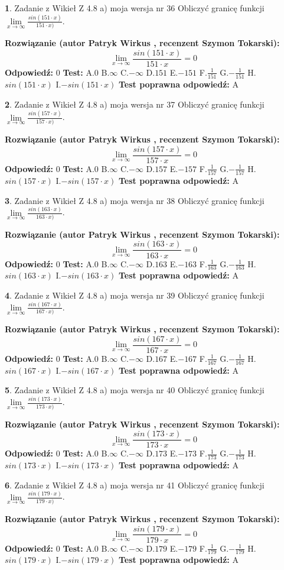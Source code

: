\documentclass[12pt, a4paper]{article}
\theoremstyle{definition} %
\newtheorem{zad}{}
\newcommand{\zadStart}[1]{\begin{zad}#1\newline}
\newcommand{\zadStop}{\end{zad}}
\newcommand{\rozwStart}[2]{\noindent \textbf{Rozwiązanie (autor #1 , recenzent #2): }\newline}
\newcommand{\rozwStop}{\newline}
\newcommand{\odpStart}{\noindent \textbf{Odpowiedź:}\newline}
\newcommand{\odpStop}{\newline}
\newcommand{\testStart}{\noindent \textbf{Test:}\newline}
\newcommand{\testStop}{\newline}
\newcommand{\kluczStart}{\noindent \textbf{Test poprawna odpowiedź:}\newline}
\newcommand{\kluczStop}{\newline}
\begin{document}
\zadStart{Zadanie z Wikieł Z 4.8 a) moja wersja nr 36}
Obliczyć granicę funkcji $\lim\limits_{x\to \infty}\frac{sin(151\cdot x)}{151\cdot x)}$.
\zadStop
\rozwStart{Patryk Wirkus}{Szymon Tokarski}
$$\lim\limits_{x\to \infty}\frac{sin(151\cdot x)}{151\cdot x}=
0$$
\rozwStop
\odpStart
$0$
\odpStop
\testStart
A.$0$ B.$\infty$ C.$-\infty$ D.$151$ E.$-151$
F.$\frac{1}{151}$ G.$-\frac{1}{151}$
H.$sin(151\cdot x)$
I.$-sin(151\cdot x)$
\testStop
\kluczStart
A
\kluczStop



\zadStart{Zadanie z Wikieł Z 4.8 a) moja wersja nr 37}
Obliczyć granicę funkcji $\lim\limits_{x\to \infty}\frac{sin(157\cdot x)}{157\cdot x)}$.
\zadStop
\rozwStart{Patryk Wirkus}{Szymon Tokarski}
$$\lim\limits_{x\to \infty}\frac{sin(157\cdot x)}{157\cdot x}=
0$$
\rozwStop
\odpStart
$0$
\odpStop
\testStart
A.$0$ B.$\infty$ C.$-\infty$ D.$157$ E.$-157$
F.$\frac{1}{157}$ G.$-\frac{1}{157}$
H.$sin(157\cdot x)$
I.$-sin(157\cdot x)$
\testStop
\kluczStart
A
\kluczStop



\zadStart{Zadanie z Wikieł Z 4.8 a) moja wersja nr 38}
Obliczyć granicę funkcji $\lim\limits_{x\to \infty}\frac{sin(163\cdot x)}{163\cdot x)}$.
\zadStop
\rozwStart{Patryk Wirkus}{Szymon Tokarski}
$$\lim\limits_{x\to \infty}\frac{sin(163\cdot x)}{163\cdot x}=
0$$
\rozwStop
\odpStart
$0$
\odpStop
\testStart
A.$0$ B.$\infty$ C.$-\infty$ D.$163$ E.$-163$
F.$\frac{1}{163}$ G.$-\frac{1}{163}$
H.$sin(163\cdot x)$
I.$-sin(163\cdot x)$
\testStop
\kluczStart
A
\kluczStop



\zadStart{Zadanie z Wikieł Z 4.8 a) moja wersja nr 39}
Obliczyć granicę funkcji $\lim\limits_{x\to \infty}\frac{sin(167\cdot x)}{167\cdot x)}$.
\zadStop
\rozwStart{Patryk Wirkus}{Szymon Tokarski}
$$\lim\limits_{x\to \infty}\frac{sin(167\cdot x)}{167\cdot x}=
0$$
\rozwStop
\odpStart
$0$
\odpStop
\testStart
A.$0$ B.$\infty$ C.$-\infty$ D.$167$ E.$-167$
F.$\frac{1}{167}$ G.$-\frac{1}{167}$
H.$sin(167\cdot x)$
I.$-sin(167\cdot x)$
\testStop
\kluczStart
A
\kluczStop



\zadStart{Zadanie z Wikieł Z 4.8 a) moja wersja nr 40}
Obliczyć granicę funkcji $\lim\limits_{x\to \infty}\frac{sin(173\cdot x)}{173\cdot x)}$.
\zadStop
\rozwStart{Patryk Wirkus}{Szymon Tokarski}
$$\lim\limits_{x\to \infty}\frac{sin(173\cdot x)}{173\cdot x}=
0$$
\rozwStop
\odpStart
$0$
\odpStop
\testStart
A.$0$ B.$\infty$ C.$-\infty$ D.$173$ E.$-173$
F.$\frac{1}{173}$ G.$-\frac{1}{173}$
H.$sin(173\cdot x)$
I.$-sin(173\cdot x)$
\testStop
\kluczStart
A
\kluczStop



\zadStart{Zadanie z Wikieł Z 4.8 a) moja wersja nr 41}
Obliczyć granicę funkcji $\lim\limits_{x\to \infty}\frac{sin(179\cdot x)}{179\cdot x)}$.
\zadStop
\rozwStart{Patryk Wirkus}{Szymon Tokarski}
$$\lim\limits_{x\to \infty}\frac{sin(179\cdot x)}{179\cdot x}=
0$$
\rozwStop
\odpStart
$0$
\odpStop
\testStart
A.$0$ B.$\infty$ C.$-\infty$ D.$179$ E.$-179$
F.$\frac{1}{179}$ G.$-\frac{1}{179}$
H.$sin(179\cdot x)$
I.$-sin(179\cdot x)$
\testStop
\kluczStart
A
\kluczStop
\end{document}

